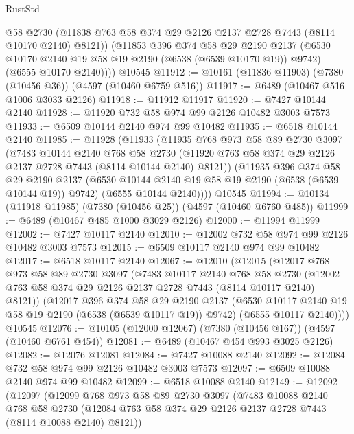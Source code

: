 \begin{lexlean}{RustStd}
\begin{coremodule}
          @58
          @2730
          (@11838 @763 @58 @374 @29 @2126 @2137 @2728 @7443 (@8114 @10170 @2140) @8121))
        (@11853
          @396
          @374
          @58
          @29
          @2190
          @2137
          (@6530 @10170 @2140 @19 @58 @19 @2190 (@6538 (@6539 @10170 @19)) @9742)
          (@6555 @10170 @2140))))
    @10545
@11912 := @10161 (@11836 @11903) (@7380 (@10456 @36)) (@4597 (@10460 @6759 @516))
@11917 := @6489 (@10467 @516 @1006 @3033 @2126)
@11918 := @11912 @11917
@11920 := @7427 @10144 @2140
@11928 := @11920 @732 @58 @974 @99 @2126 @10482 @3003 @7573
@11933 := @6509 @10144 @2140 @974 @99 @10482
@11935 := @6518 @10144 @2140
@11985 := @11928
    (@11933
      (@11935
        @768
        @973
        @58
        @89
        @2730
        @3097
        (@7483
          @10144
          @2140
          @768
          @58
          @2730
          (@11920 @763 @58 @374 @29 @2126 @2137 @2728 @7443 (@8114 @10144 @2140) @8121))
        (@11935
          @396
          @374
          @58
          @29
          @2190
          @2137
          (@6530 @10144 @2140 @19 @58 @19 @2190 (@6538 (@6539 @10144 @19)) @9742)
          (@6555 @10144 @2140))))
    @10545
@11994 := @10134 (@11918 @11985) (@7380 (@10456 @25)) (@4597 (@10460 @6760 @485))
@11999 := @6489 (@10467 @485 @1000 @3029 @2126)
@12000 := @11994 @11999
@12002 := @7427 @10117 @2140
@12010 := @12002 @732 @58 @974 @99 @2126 @10482 @3003 @7573
@12015 := @6509 @10117 @2140 @974 @99 @10482
@12017 := @6518 @10117 @2140
@12067 := @12010
    (@12015
      (@12017
        @768
        @973
        @58
        @89
        @2730
        @3097
        (@7483
          @10117
          @2140
          @768
          @58
          @2730
          (@12002 @763 @58 @374 @29 @2126 @2137 @2728 @7443 (@8114 @10117 @2140) @8121))
        (@12017
          @396
          @374
          @58
          @29
          @2190
          @2137
          (@6530 @10117 @2140 @19 @58 @19 @2190 (@6538 (@6539 @10117 @19)) @9742)
          (@6555 @10117 @2140))))
    @10545
@12076 := @10105 (@12000 @12067) (@7380 (@10456 @167)) (@4597 (@10460 @6761 @454))
@12081 := @6489 (@10467 @454 @993 @3025 @2126)
@12082 := @12076 @12081
@12084 := @7427 @10088 @2140
@12092 := @12084 @732 @58 @974 @99 @2126 @10482 @3003 @7573
@12097 := @6509 @10088 @2140 @974 @99 @10482
@12099 := @6518 @10088 @2140
@12149 := @12092
    (@12097
      (@12099
        @768
        @973
        @58
        @89
        @2730
        @3097
        (@7483
          @10088
          @2140
          @768
          @58
          @2730
          (@12084 @763 @58 @374 @29 @2126 @2137 @2728 @7443 (@8114 @10088 @2140) @8121))

\end{coremodule}
\end{lexlean}

